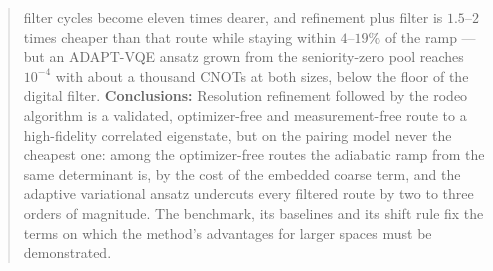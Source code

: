 \documentclass[
  aps,            %
  prc,            %
  reprint,        %
  superscriptaddress,
  floatfix,
  nofootinbib
]{revtex4-2}
\begin{document}
\begin{abstract}
filter cycles become eleven times dearer, and refinement plus filter is
$1.5$--$2$ times cheaper than that route while staying within $4$--$19\%$
of the ramp --- but an ADAPT-VQE ansatz grown from the seniority-zero pool
reaches $10^{-4}$ with about a thousand CNOTs at both sizes, below the
floor of the digital filter.
\textbf{Conclusions:} Resolution refinement followed by the rodeo algorithm
is a validated, optimizer-free and measurement-free route to a
high-fidelity correlated eigenstate, but on the pairing model never the
cheapest one: among the optimizer-free routes the adiabatic ramp from the
same determinant is, by the cost of the embedded coarse term, and the
adaptive variational ansatz undercuts every filtered route by two to three
orders of magnitude.  The benchmark, its baselines and its shift rule fix
the terms on which the method's advantages for larger spaces must be
demonstrated.
\end{abstract}

\maketitle



\end{document}
